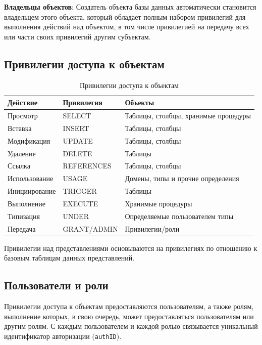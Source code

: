 \documentclass[a4paper,12pt]{article}
\begin{document}
\textbf{Владельцы объектов}: Создатель объекта базы данных автоматически становится владельцем этого объекта, который обладает полным набором привилегий для выполнения действий над объектом, в том числе привилегией на передачу всех или части своих привилегий другим субъектам.

\subsection{Привилегии доступа к объектам}

\begin{table}[h!]
    \centering
    \begin{tabular}{|l|l|l|}
        \hline
        \textbf{Действие} & \textbf{Привилегия} & \textbf{Объекты} \\
        \hline
        Просмотр & SELECT & Таблицы, столбцы, хранимые процедуры \\
        \hline
        Вставка & INSERT & Таблицы, столбцы \\
        \hline
        Модификация & UPDATE & Таблицы, столбцы \\
        \hline
        Удаление & DELETE & Таблицы \\
        \hline
        Ссылка & REFERENCES & Таблицы, столбцы \\
        \hline
        Использование & USAGE & Домены, типы и прочие определения \\
        \hline
        Инициирование & TRIGGER & Таблицы \\
        \hline
        Выполнение & EXECUTE & Хранимые процедуры \\
        \hline
        Типизация & UNDER & Определяемые пользователем типы \\
        \hline
        Передача & GRANT/ADMIN & Привилегии/роли \\
        \hline
    \end{tabular}
    \caption{Привилегии доступа к объектам}
\end{table}

Привилегии над представлениями основываются на привилегиях по отношению к базовым таблицам данных представлений.

\subsection{Пользователи и роли}

Привилегии доступа к объектам предоставляются пользователям, а также ролям, выполнение которых, в свою очередь, может предоставляться пользователям или другим ролям. С каждым пользователем и каждой ролью связывается уникальный идентификатор авторизации (\texttt{authID}).
\end{document}
